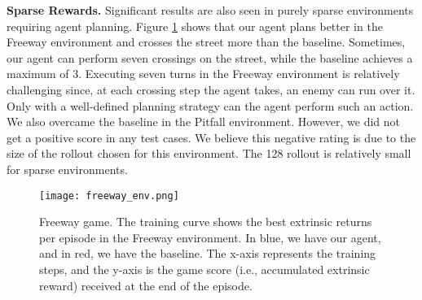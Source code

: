 \textbf{Sparse Rewards.} Significant results are also seen in purely sparse environments requiring agent planning. Figure \ref{fig:freeway_resultados} shows that our agent plans better in the Freeway environment and crosses the street more than the baseline. Sometimes, our agent can perform seven crossings on the street, while the baseline achieves a maximum of 3. Executing seven turns in the Freeway environment is relatively challenging since, at each crossing step the agent takes, an enemy can run over it. Only with a well-defined planning strategy can the agent perform such an action. We also overcame the baseline in the Pitfall environment. However, we did not get a positive score in any test cases. We believe this negative rating is due to the size of the rollout chosen for this environment. The 128 rollout is relatively small for sparse environments.


\begin{figure}[htb]
     \centering
     \texttt{[image: freeway\_env.png]}
     \caption{Freeway game. The training curve shows the best extrinsic returns per episode in the Freeway environment. In blue, we have our agent, and in red, we have the baseline. The x-axis represents the training steps, and the y-axis is the game score (i.e., accumulated extrinsic reward) received at the end of the episode.}
    \label{fig:freeway_resultados}
\end{figure}




